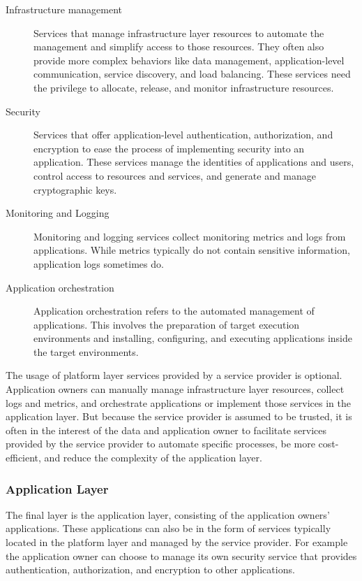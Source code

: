 \begin{description}
  \item[Infrastructure management]
    Services that manage infrastructure layer resources to automate the
    management and simplify access to those resources. They often also provide
    more complex behaviors like data management, application-level
    communication, service discovery, and load balancing. These services need
    the privilege to allocate, release, and monitor infrastructure resources.

  \item[Security]
    Services that offer application-level authentication, authorization, and
    encryption to ease the process of implementing security into an application.
    These services manage the identities of applications and users, control
    access to resources and services, and generate and manage cryptographic
    keys.

  \item[Monitoring and Logging]
    Monitoring and logging services collect monitoring metrics and logs from
    applications. While metrics typically do not contain sensitive information,
    application logs sometimes do.

  \item[Application orchestration]
    Application orchestration refers to the automated management of
    applications. This involves the preparation of target execution environments
    and installing, configuring, and executing applications inside the target
    environments.
\end{description}

The usage of platform layer services provided by a service provider is optional.
Application owners can manually manage infrastructure layer resources, collect
logs and metrics, and orchestrate applications or implement those services in
the application layer. But because the service provider is assumed to be
trusted, it is often in the interest of the data and application owner to
facilitate services provided by the service provider to automate specific
processes, be more cost-efficient, and reduce the complexity of the application
layer.

\subsubsection{Application Layer}

The final layer is the application layer, consisting of the application owners'
applications. These applications can also be in the form of services typically
located in the platform layer and managed by the service provider. For example
the application owner can choose to manage its own security service that
provides authentication, authorization, and encryption to other applications.

